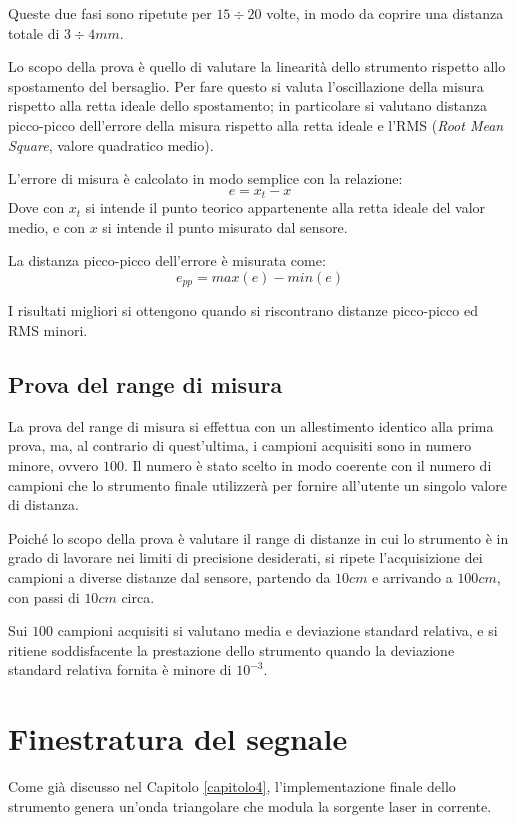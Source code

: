 Queste due fasi sono ripetute per $15 \div 20$ volte, in modo da coprire una distanza totale di $3 \div 4 mm$.

Lo scopo della prova è quello di valutare la linearità dello strumento rispetto allo spostamento del bersaglio. Per fare questo si valuta l'oscillazione della misura rispetto alla retta ideale dello spostamento; in particolare si valutano distanza picco-picco dell'errore della misura rispetto alla retta ideale e l'RMS (\textit{Root Mean Square}, valore quadratico medio).

L'errore di misura è calcolato in modo semplice con la relazione:
\begin{equation}
	e = x_t - x 
\end{equation}
Dove con $x_t$ si intende il punto teorico appartenente alla retta ideale del valor medio, e con $x$ si intende il punto misurato dal sensore. 

La distanza picco-picco dell'errore è misurata come:
\begin{equation}
	e_{pp} = max(e) - min(e)
\end{equation}

I risultati migliori si ottengono quando si riscontrano distanze picco-picco ed RMS minori.

\subsection{Prova del range di misura}
La prova del range di misura si effettua con un allestimento identico alla prima prova, ma, al contrario di quest'ultima, i campioni acquisiti sono in numero minore, ovvero $100$. Il numero è stato scelto in modo coerente con il numero di campioni che lo strumento finale utilizzerà per fornire all'utente un singolo valore di distanza. 

Poiché lo scopo della prova è valutare il range di distanze in cui lo strumento è in grado di lavorare nei limiti di precisione desiderati, si ripete l'acquisizione dei campioni a diverse distanze dal sensore, partendo da $10 cm$ e arrivando a $100 cm$, con passi di $10 cm$ circa.

Sui $100$ campioni acquisiti si valutano media e deviazione standard relativa, e si ritiene soddisfacente la prestazione dello strumento quando la deviazione standard relativa fornita è minore di $10^{-3}$.

\section{Finestratura del segnale}
Come già discusso nel Capitolo \ref{capitolo4}, l'implementazione finale dello strumento genera un'onda triangolare che modula la sorgente laser in corrente. 

